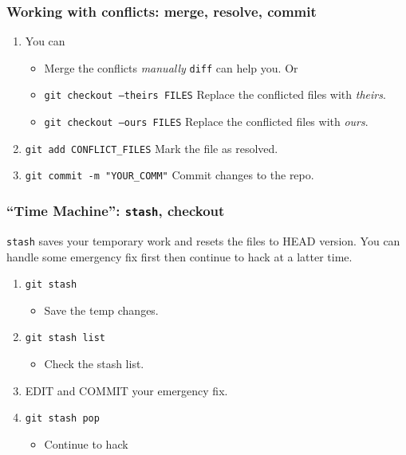 \documentclass[11pt,ignorenonframetext,]{beamer}
\begin{document}
\begin{frame}[fragile]\frametitle{Working with conflicts: merge,
resolve, commit}

\begin{enumerate}[1.]
\item You can
  \begin{itemize}
	  \item Merge the conflicts \emph{manually} \texttt{diff} can help you. Or
	  \item \texttt{git checkout --theirs FILES} Replace the conflicted files with \emph{theirs}.
	  \item \texttt{git checkout --ours FILES} Replace the conflicted files with \emph{ours}.
  \end{itemize}
\item
  \texttt{git add CONFLICT\_FILES} Mark the file as resolved.
\item
  \texttt{git commit -m "YOUR\_COMM"} Commit changes to the repo.
\end{enumerate}
\end{frame}

\begin{frame}[fragile, label=gittime]\frametitle{``Time Machine'': \texttt{stash},
checkout}

\texttt{stash} saves your temporary work and resets the files to HEAD
version. You can handle some emergency fix first then continue to hack
at a latter time.

\begin{enumerate}[1.]
\item
  \texttt{git stash}
  \begin{itemize}
  \item
    Save the temp changes.
  \end{itemize}
\item
  \texttt{git stash list}
  \begin{itemize}
  \item
    Check the stash list.
  \end{itemize}
\item
  EDIT and COMMIT your emergency fix.
\item
  \texttt{git stash pop}
  \begin{itemize}
  \item
    Continue to hack
  \end{itemize}
\end{enumerate}
\end{frame}
\end{document}
